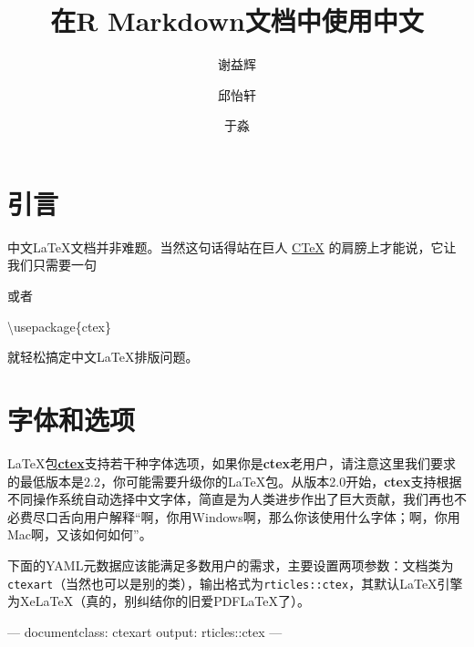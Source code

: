 \documentclass[hyperref,]{ctexart}
\title{在R Markdown文档中使用中文}
\author{谢益辉 \and 邱怡轩 \and 于淼}
\date{}
\newenvironment{Shaded}{\begin{snugshade}}{\end{snugshade}}
\newcommand{\AttributeTok}[1]{\textcolor[rgb]{0.77,0.63,0.00}{#1}}
\newcommand{\BuiltInTok}[1]{#1}
\newcommand{\CommentTok}[1]{\textcolor[rgb]{0.56,0.35,0.01}{\textit{#1}}}
\newcommand{\ExtensionTok}[1]{#1}
\newcommand{\FunctionTok}[1]{\textcolor[rgb]{0.00,0.00,0.00}{#1}}
\newcommand{\NormalTok}[1]{#1}
\newcommand{\OtherTok}[1]{\textcolor[rgb]{0.56,0.35,0.01}{#1}}
\begin{document}
\maketitle

{
\setcounter{tocdepth}{2}
\tableofcontents
}
\section{引言}

中文LaTeX文档并非难题。当然这句话得站在巨人 \href{http://ctex.org}{CTeX}
的肩膀上才能说，它让我们只需要一句

\begin{Shaded}
\end{Shaded}

或者

\begin{Shaded}
\begin{Highlighting}[]
\BuiltInTok{\textbackslash{}usepackage}\NormalTok{\{}\ExtensionTok{ctex}\NormalTok{\}}
\end{Highlighting}
\end{Shaded}

就轻松搞定中文LaTeX排版问题。

\section{字体和选项}

LaTeX包\href{http://ctan.org/pkg/ctex}{\textbf{ctex}}支持若干种字体选项，如果你是\textbf{ctex}老用户，请注意这里我们要求的最低版本是2.2，你可能需要升级你的LaTeX包。从版本2.0开始，\textbf{ctex}支持根据不同操作系统自动选择中文字体，简直是为人类进步作出了巨大贡献，我们再也不必费尽口舌向用户解释``啊，你用Windows啊，那么你该使用什么字体；啊，你用Mac啊，又该如何如何''。

下面的YAML元数据应该能满足多数用户的需求，主要设置两项参数：文档类为\texttt{ctexart}（当然也可以是别的类），输出格式为\texttt{rticles::ctex}，其默认LaTeX引擎为XeLaTeX（真的，别纠结你的旧爱PDFLaTeX了）。

\begin{Shaded}
\begin{Highlighting}[]
\OtherTok{---}
\FunctionTok{documentclass:}\AttributeTok{ ctexart}
\FunctionTok{output:}\AttributeTok{ rticles::ctex}
\OtherTok{---}
\end{Highlighting}
\end{Shaded}
\end{document}
